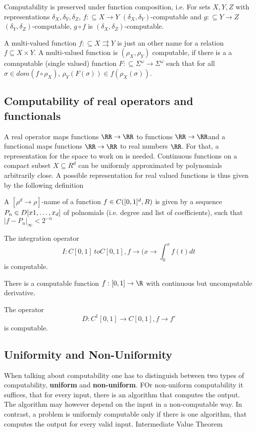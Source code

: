 \begin{definition}
\begin{theorem}
Computability is preserved under function composition, i.e.
For sets $X,Y,Z$ with representations $\delta_X, \delta_Y, \delta_Z$, 
$f:\subseteq X \to Y$ $(\delta_X, \delta_Y)$-computable and $g:\subseteq Y \to Z$ $(\delta_Y, \delta_Z)$-computable,
$g \circ f$ is $(\delta_X, \delta_Z)$-computable.
\end{theorem}
\begin{definition}
A multi-valued function $f: \subseteq X \rightrightarrows Y$ is just an other name for a relation $f \subseteq X \times Y$.
A multi-valued function is $(\rho_X, \rho_Y)$ computable, if there is a a comnputable (single valued) function 
$F: \subseteq \Sigma^\omega \to \Sigma^\omega$ such that for all $\sigma \in dom(f \circ \rho_X)$, $\rho_Y(F(\sigma)) \in f(\rho_X(\sigma))$. 
\end{definition}
\subsection{Computability of real operators and functionals}
A real operator maps functions $\RR \to \RR$ to functions $\RR \to \RR$and a functional maps functions $\RR \to \RR$ to real numbers $\RR$.
For that, a representation for the space to work on is needed.
Continuous functions on a compact subset $X \subseteq R^d$ can be uniformly approximated by polynomials arbitrarily close.
A possible representation for real valued functions is thus given by the following definition 
\begin{definition}
A $[\rho^d \to \rho]$-name of a function $f \in C([0,1]^d, \\R)$ is given by a sequence $P_n \in \\D[x1, \dots, x_d]$ of polnomials (i.e. degree and list of coefficients), such that $\vert f - P_n \vert_\infty < 2^{-n}$   
\begin{theorem}[name?]
The integration operator 
$$I: C[0,1] \ to C[0,1], f \to (x \to \int_0^x f(t) dt$$   
is computable.
\end{theorem}
\begin{theorem}[Myhill 1971]
There is a computable function $f: [0,1] \to \R$ with continuous but uncomputable derivative. 
\end{theorem}
\begin{theorem}
The operator 
$$ D: C^1[0,1] \to C[0,1], f \to f'$$
is computable.
\end{theorem}
\end{definition}
\subsection{Uniformity and Non-Uniformity}
When talking about computability one has to distinguish between two types of computability, \textbf{uniform} and \textbf{non-uniform}.
FOr non-uniform computability it suffices, that for every input, there is an algorithm that computes the output. 
The algorithm may however depend on the input in a non-computable way.
In contrast, a problem is uniformly computable only if there is one algorithm, that computes the output for every valid input. 
Intermediate Value Theorem

\end{definition}
